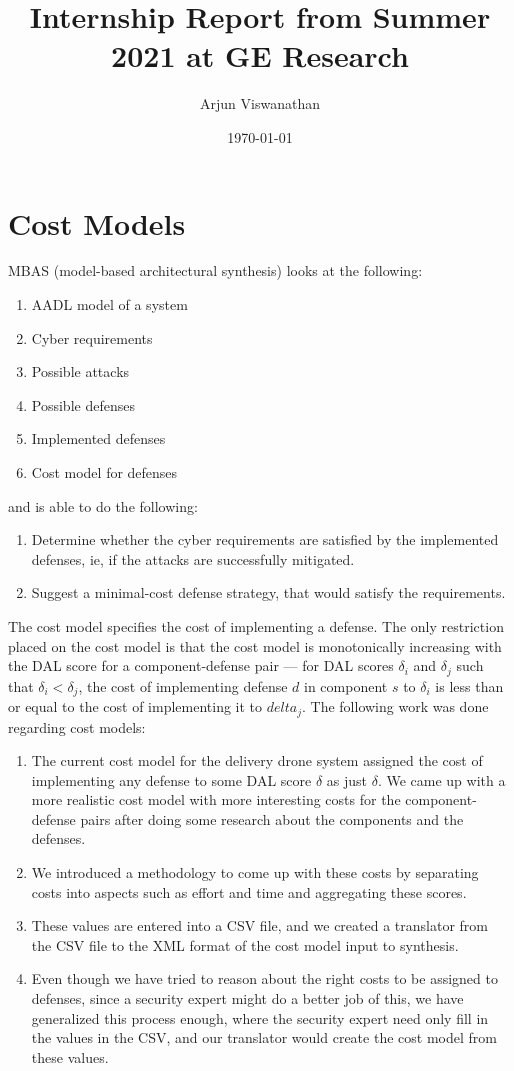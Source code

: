 \documentclass{article}
\title{Internship Report from Summer 2021 at GE Research}
\author{Arjun Viswanathan}
\date{\today}
\begin{document}
\maketitle

\section{Cost Models}
	\label{sec:costmodel}
	MBAS (model-based architectural synthesis) 
	looks at the following:
	\begin{enumerate}
		\item AADL model of a system 
		\item Cyber requirements
		\item Possible attacks 
		\item Possible defenses 
		\item Implemented defenses 
		\item Cost model for defenses
	\end{enumerate}
	and is able to do the following:
	\begin{enumerate}
		\item Determine whether the cyber
		requirements are satisfied by the
		implemented defenses, ie, if the 
		attacks are successfully mitigated.
		\item Suggest a minimal-cost defense 
		strategy, that would satisfy  the 
		requirements. 
	\end{enumerate}
	The cost model specifies the cost of 
	implementing a defense. The only 
	restriction placed on the cost model
	is that the cost model is monotonically
	increasing with the DAL score for a 
	component-defense pair --- for DAL scores
	$\delta_i$ and $\delta_j$ such that 
	$\delta_i < \delta_j$, the cost of 
	implementing defense $d$ in component
	$s$ to $\delta_i$ is less than or 
	equal to the cost of implementing it 
	to $delta_j$. The following work was
	done regarding cost models:
	\begin{enumerate}
		\item The current cost model for the 
		delivery drone system assigned the cost 
		of implementing any defense to some 
		DAL score $\delta$ as just $\delta$.
		We came up with a more realistic cost 
		model with more interesting costs for 
		the component-defense pairs after
		doing some research about the 
		components and the defenses.
		\item We introduced a methodology to 
		come up with these costs by separating 
		costs into aspects such as effort and 
		time and aggregating these scores.
		\item These values are entered into 
		a CSV file, and we created a 
		translator from the CSV file to the 
		XML format of the cost model input to
		synthesis.
		\item Even though we have tried to 
		reason about the right costs to 
		be assigned to defenses, since a 
		security expert might do a better 
		job of this, we have generalized 
		this process enough, where the security
		expert need only fill in the values
		in the CSV, and our translator would
		create the cost model from these
		values.
	\end{enumerate}
\end{document}
